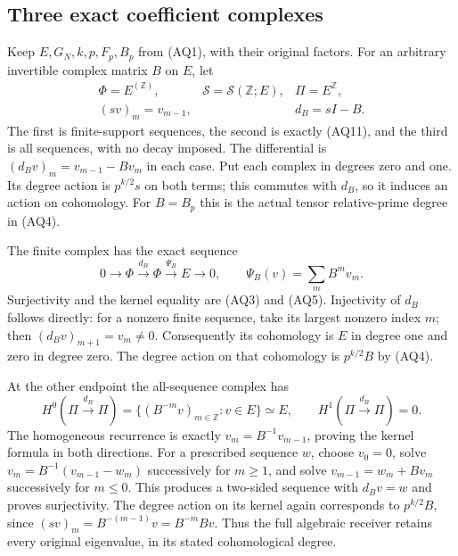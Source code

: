 \documentclass[11pt,a4paper]{article}
\theoremstyle{definition}\newtheorem{definition}[theorem]{Definition}
\begin{document}
\subsection{Three exact coefficient complexes}
Keep $E,G_N,k,p,F_p,B_p$ from (AQ1), with their original factors.
For an arbitrary invertible complex matrix $B$ on $E$, let
\[
 \begin{array}{lll}
 \Phi=E^{(\mathbb Z)},&
 \mathscr S=\mathscr S(\mathbb Z;E),&
 \Pi=E^{\mathbb Z},\\
 (sv)_m=v_{m-1},&& d_B=sI-B.
 \end{array}
 \tag{PC1}
\]
The first is finite-support sequences, the second is exactly (AQ11),
and the third is all sequences, with no decay imposed. The differential
is $(d_Bv)_m=v_{m-1}-Bv_m$ in each case. Put each complex in degrees
zero and one. Its degree action is $p^{k/2}s$ on both terms; this
commutes with $d_B$, so it induces an action on cohomology. For $B=B_p$
this is the actual tensor relative-prime degree in (AQ4).

The finite complex has the exact sequence
\[
 0\longrightarrow\Phi\xrightarrow{d_B}\Phi
 \xrightarrow{\Psi_B}E\longrightarrow0,
 \qquad \Psi_B(v)=\sum_mB^mv_m.
 \tag{PC2}
\]
Surjectivity and the kernel equality are (AQ3) and (AQ5). Injectivity
of $d_B$ follows directly: for a nonzero finite sequence, take its
largest nonzero index $m$; then $(d_Bv)_{m+1}=v_m\ne0$.
Consequently its cohomology is $E$ in degree one and zero in degree
zero. The degree action on that cohomology is $p^{k/2}B$ by (AQ4).

At the other endpoint the all-sequence complex has
\[
 H^0(\Pi\xrightarrow{d_B}\Pi)
   =\{(B^{-m}v)_{m\in\mathbb Z}:v\in E\}\simeq E,
 \qquad H^1(\Pi\xrightarrow{d_B}\Pi)=0.
 \tag{PC3}
\]
The homogeneous recurrence is exactly $v_m=B^{-1}v_{m-1}$, proving
the kernel formula in both directions. For a prescribed sequence
$w$, choose $v_0=0$, solve
$v_m=B^{-1}(v_{m-1}-w_m)$ successively for $m\ge1$, and solve
$v_{m-1}=w_m+Bv_m$ successively for $m\le0$. This produces a
two-sided sequence with $d_Bv=w$ and proves surjectivity. The degree
action on its kernel again corresponds to $p^{k/2}B$, since
$(sv)_m=B^{-(m-1)}v=B^{-m}Bv$. Thus the full algebraic receiver
retains every original eigenvalue, in its stated cohomological degree.
\end{document}
